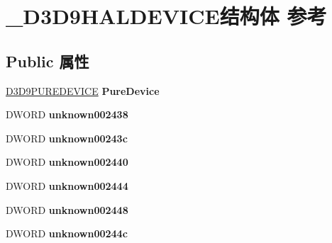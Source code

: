 \hypertarget{struct___d3_d9_h_a_l_d_e_v_i_c_e}{}\section{\+\_\+\+D3\+D9\+H\+A\+L\+D\+E\+V\+I\+C\+E结构体 参考}
\label{struct___d3_d9_h_a_l_d_e_v_i_c_e}
\subsection*{Public 属性}
\begin{DoxyCompactItemize}
\item 
\mbox{\label{struct___d3_d9_h_a_l_d_e_v_i_c_e_a203429a445090e2265fcbc65c055c7f6}} 
\hyperlink{struct___d3_d9_p_u_r_e_d_e_v_i_c_e}{D3\+D9\+P\+U\+R\+E\+D\+E\+V\+I\+CE} {\bfseries Pure\+Device}
\item 
\mbox{\label{struct___d3_d9_h_a_l_d_e_v_i_c_e_a97c319784532e29eeaa26b8812c11feb}} 
D\+W\+O\+RD {\bfseries unknown002438}
\item 
\mbox{\label{struct___d3_d9_h_a_l_d_e_v_i_c_e_a3281f4d1d6f6363140caa90e1ede9e4d}} 
D\+W\+O\+RD {\bfseries unknown00243c}
\item 
\mbox{\label{struct___d3_d9_h_a_l_d_e_v_i_c_e_a3284d71456e7b25c0f8be17612352c49}} 
D\+W\+O\+RD {\bfseries unknown002440}
\item 
\mbox{\label{struct___d3_d9_h_a_l_d_e_v_i_c_e_abf9408dfe8e6b7e90bb1ea823b204701}} 
D\+W\+O\+RD {\bfseries unknown002444}
\item 
\mbox{\label{struct___d3_d9_h_a_l_d_e_v_i_c_e_a061325dd6f40eee696c02afe1e3ba167}} 
D\+W\+O\+RD {\bfseries unknown002448}
\item 
\mbox{\label{struct___d3_d9_h_a_l_d_e_v_i_c_e_a9bbbfbfb49771517e6b2c27f0f8a4595}} 
D\+W\+O\+RD {\bfseries unknown00244c}
\item 
\mbox{\label{struct___d3_d9_h_a_l_d_e_v_i_c_e_ae61cee1744183ddc0b8747b30a05a1c6}} 

\end{DoxyCompactItemize}
